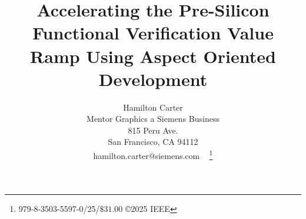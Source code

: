 \documentclass[twocolumn,letterpaper]{IEEEAerospaceCLS}  %
\begin{document}
\title{Accelerating the Pre-Silicon Functional Verification Value Ramp Using Aspect Oriented Development}

\author{%
Hamilton Carter\\ 
Mentor Graphics a Siemens  Business\\
815 Peru Ave.\\
San Francisco, CA 94112\\
hamilton.carter@siemens.com
\
\thanks{\footnotesize 979-8-3503-5597-0/25/$\$31.00$ \copyright2025 IEEE}              %
}



\maketitle

\thispagestyle{plain}
\pagestyle{plain}



\maketitle

\thispagestyle{plain}
\pagestyle{plain}
\end{document}

